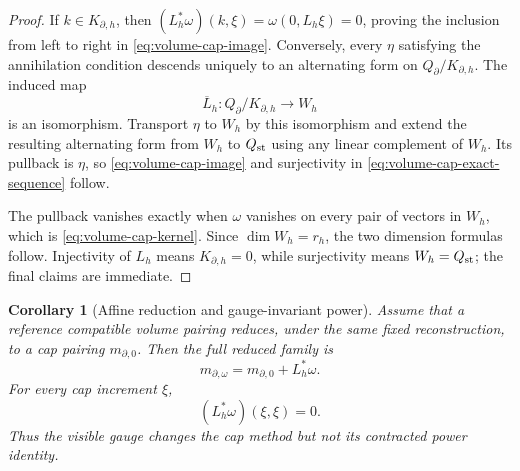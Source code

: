 \documentclass[11pt,a4paper]{article}
\newtheorem{corollary}[theorem]{Corollary}
\begin{document}
\begin{proof}
If \(k\in K_{\partial,h}\), then
\((L_h^*\omega)(k,\xi)=\omega(0,L_h\xi)=0\), proving the inclusion from
left to right in \cref{eq:volume-cap-image}.  Conversely, every
\(\eta\) satisfying the annihilation condition descends uniquely to an
alternating form on \(Q_\partial/K_{\partial,h}\).  The induced map
\[
 \overline L_h:Q_\partial/K_{\partial,h}\longrightarrow W_h
\]
is an isomorphism.  Transport \(\eta\) to \(W_h\) by this isomorphism and
extend the resulting alternating form from \(W_h\) to \(Q_{\rm st}\)
using any linear complement of \(W_h\).  Its pullback is \(\eta\), so
\cref{eq:volume-cap-image} and surjectivity in
\cref{eq:volume-cap-exact-sequence} follow.

The pullback vanishes exactly when \(\omega\) vanishes on every pair of
vectors in \(W_h\), which is \cref{eq:volume-cap-kernel}.  Since
\(\dim W_h=r_h\), the two dimension formulas follow.  Injectivity of
\(L_h\) means \(K_{\partial,h}=0\), while surjectivity means
\(W_h=Q_{\rm st}\); the final claims are immediate.
\end{proof}

\begin{corollary}[Affine reduction and gauge-invariant power]
\label{cor:affine-volume-cap}
Assume that a reference compatible volume pairing reduces, under the same
fixed reconstruction, to a cap pairing \(m_{\partial,0}\).  Then the full reduced
family is
\begin{equation}\label{eq:reduced-affine-family}
 m_{\partial,\omega}
 =m_{\partial,0}+L_h^*\omega.
\end{equation}
For every cap increment \(\xi\),
\[
 (L_h^*\omega)(\xi,\xi)=0.
\]
Thus the visible gauge changes the cap method but not its contracted power
identity.
\end{corollary}
\end{document}
